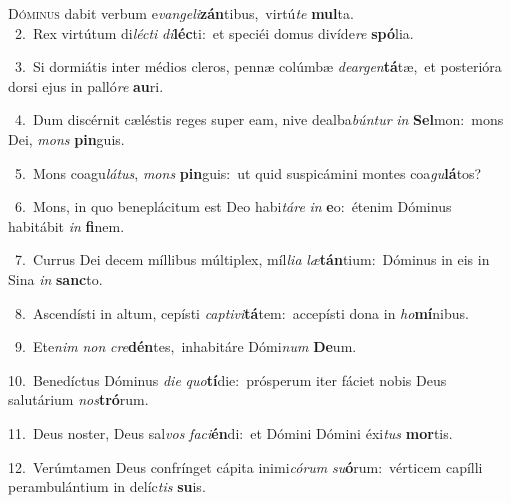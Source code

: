 \lettrine{\initial\textcolor{\initialcolor}{D}}{óminus} dabit verbum e\-\textit{van}\-\textit{ge}\textit{li}\textbf{zán}tibus,~\star virtú\textit{te} \textbf{mul}\-ta.\\
{\numbfont\textcolor{\numbcolor}{~2.}}~Rex virtútum di\-\textit{léc}\-\textit{ti} \textit{di}\-\textbf{léc}ti:~\star et speciéi domus divíde\textit{re} \textbf{spó}\-lia.\par
{\numbfont\textcolor{\numbcolor}{~3.}}~Si dormiátis inter médios cleros, pennæ colúmbæ \textit{de}\-\textit{ar}\textit{gen}\textbf{tá}tæ,~\star et posterióra dorsi ejus in palló\textit{re} \textbf{au}\-ri.\par
{\numbfont\textcolor{\numbcolor}{~4.}}~Dum discérnit cæléstis reges super eam, nive dealba\-\textit{bún}\-\textit{tur} \textit{in} \textbf{Sel}\-mon:~\star mons Dei, \textit{mons} \textbf{pin}\-guis.\par
{\numbfont\textcolor{\numbcolor}{~5.}}~Mons coagu\-\textit{lá}\-\textit{tus}, \textit{mons} \textbf{pin}\-guis:~\star ut quid suspicámini montes coa\-\textit{gu}\-\textbf{lá}tos?\par
{\numbfont\textcolor{\numbcolor}{~6.}}~Mons, in quo beneplácitum est Deo habi\-\textit{tá}\-\textit{re} \textit{in} \textbf{e}\-o:~\star étenim Dóminus habitábit \textit{in} \textbf{fi}\-nem.\par
{\numbfont\textcolor{\numbcolor}{~7.}}~Currus Dei decem míllibus múltiplex, míl\-\textit{li}\-\textit{a} \textit{læ}\-\textbf{tán}tium:~\star Dóminus in eis in Sina \textit{in} \textbf{sanc}\-to.\par
{\numbfont\textcolor{\numbcolor}{~8.}}~Ascendísti in altum, cepísti \textit{cap}\-\textit{ti}\textit{vi}\textbf{tá}tem:~\star accepísti dona in \textit{ho}\-\textbf{mí}nibus.\par
{\numbfont\textcolor{\numbcolor}{~9.}}~Ete\textit{nim} \textit{non} \textit{cre}\-\textbf{dén}tes,~\star inhabitáre Dómi\textit{num} \textbf{De}\-um.\par
{\numbfont\textcolor{\numbcolor}{10.}}~Benedíctus Dóminus \textit{di}\-\textit{e} \textit{quo}\-\textbf{tí}die:~\star prósperum iter fáciet nobis Deus salutárium \textit{nos}\-\textbf{tró}rum.\par
{\numbfont\textcolor{\numbcolor}{11.}}~Deus noster, Deus sal\textit{vos} \textit{fa}\-\textit{ci}\textbf{én}di:~\star et Dómini Dómini éxi\textit{tus} \textbf{mor}\-tis.\par
{\numbfont\textcolor{\numbcolor}{12.}}~Verúmtamen Deus confrínget cápita inimi\-\textit{có}\-\textit{rum} \textit{su}\-\textbf{ó}rum:~\star vérticem capílli perambulántium in delíc\textit{tis} \textbf{su}\-is.\par
